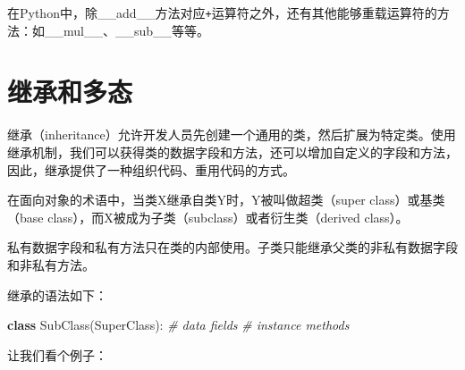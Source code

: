 \documentclass[]{ctexbook}
\newenvironment{Shaded}{\begin{snugshade}}{\end{snugshade}}
\newcommand{\CommentTok}[1]{\textcolor[rgb]{0.56,0.35,0.01}{\textit{#1}}}
\newcommand{\KeywordTok}[1]{\textcolor[rgb]{0.13,0.29,0.53}{\textbf{#1}}}
\newcommand{\NormalTok}[1]{#1}
\begin{document}
在Python中，除\_\_add\_\_方法对应\texttt{+}运算符之外，还有其他能够重载运算符的方法：如\_\_mul\_\_、\_\_sub\_\_等等。

\hypertarget{ux7ee7ux627fux548cux591aux6001}{%
\section{继承和多态}\label{ux7ee7ux627fux548cux591aux6001}}

继承（inheritance）允许开发人员先创建一个通用的类，然后扩展为特定类。使用继承机制，我们可以获得类的数据字段和方法，还可以增加自定义的字段和方法，因此，继承提供了一种组织代码、重用代码的方式。

在面向对象的术语中，当类X继承自类Y时，Y被叫做超类（super class）或基类（base class），而X被成为子类（subclass）或者衍生类（derived class）。

私有数据字段和私有方法只在类的内部使用。子类只能继承父类的非私有数据字段和非私有方法。

继承的语法如下：

\begin{Shaded}
\begin{Highlighting}[]
\KeywordTok{class}\NormalTok{ SubClass(SuperClass):}
  \CommentTok{# data fields}
  \CommentTok{# instance methods}
\end{Highlighting}
\end{Shaded}

让我们看个例子：
\end{document}
